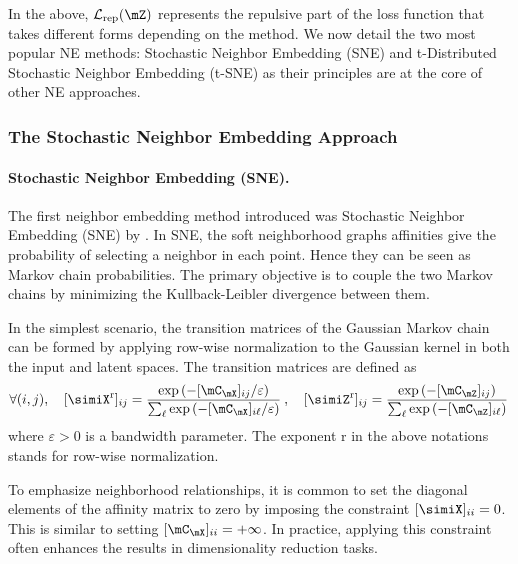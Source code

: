 In the above, \(\mathcal{L}_{\mathrm{rep}}(\mZ)\) represents the repulsive part of the loss function that takes different forms depending on the method. We now detail the two most popular NE methods: Stochastic Neighbor Embedding (SNE) and t-Distributed Stochastic Neighbor Embedding (t-SNE) as their principles are at the core of other NE approaches.

\subsubsection{The Stochastic Neighbor Embedding Approach}\label{sec:sne}

\paragraph{Stochastic Neighbor Embedding (SNE).}The first neighbor embedding method introduced was Stochastic Neighbor Embedding (SNE) by \cite{hinton2002stochastic}. In SNE, the soft neighborhood graphs affinities give the probability of selecting a neighbor in each point. Hence they can be seen as Markov chain probabilities. The primary objective is to couple the two Markov chains by minimizing the Kullback-Leibler divergence between them. 

In the simplest scenario, the transition matrices of the Gaussian Markov chain can be formed by applying row-wise normalization to the Gaussian kernel in both the input and latent spaces. The transition matrices are defined as
\begin{align}
    \forall (i,j), \quad [\simiX^{\mathrm{r}}]_{ij} = \frac{\exp{(-[\mC_{\mX}]_{ij} / \varepsilon)}}{\sum_\ell \exp{(-[\mC_{\mX}]_{i\ell} / \varepsilon)} } \:, \quad [\simiZ^{\mathrm{r}}]_{ij} = \frac{\exp{(-[\mC_{\mZ}]_{ij})}}{\sum_\ell \exp{(-[\mC_{\mZ}]_{i\ell})}} \,
\end{align}
where $\varepsilon > 0$ is a bandwidth parameter. The exponent $\mathrm{r}$ in the above notations stands for row-wise normalization.

\begin{remark}
    To emphasize neighborhood relationships, it is common to set the diagonal elements of the affinity matrix to zero by imposing the constraint $[\simiX]_{ii} = 0$. This is similar to setting $[\mC_{\mX}]_{ii} = +\infty$. In practice, applying this constraint often enhances the results in dimensionality reduction tasks.
\end{remark}

